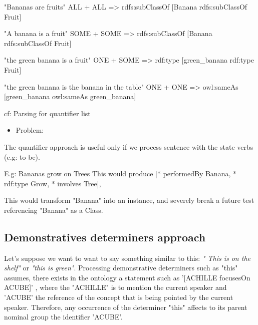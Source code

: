 \documentclass[twoside,a4paper,10pt]{report}
\newcommand{\dokutitleleveltree}[1]{\subsection{#1}}
\newcommand{\dokuitalic}[1]{\textsl{#1}}
\begin{document}
\small
\begin{verbatimtab}
  
  "Bananas         are             fruits"
    ALL             +               ALL                   => rdfs:subClassOf
  [Banana     rdfs:subClassOf      Fruit]
  
  "A banana        is               a fruit"
    SOME           +                 SOME                 => rdfs:subClassOf
  [Banana     rdfs:subClassOf       Fruit]
  
  "the green banana    is           a fruit"
     ONE               +             SOME                 => rdf:type
  [green_banana    rdf:type         Fruit]
  
  "the green banana     is       the banana in the table"
      ONE               +                ONE              => owl:sameAs
  [green_banana    owl:sameAs       green_banana]
  
  cf: Parsing for quantifier list
  
\end{verbatimtab}
\normalsize
\begin{itemize}
\item  Problem:
\end{itemize}


The quantifier approach is useful only if we process sentence with the state verbs (e.g: to be).


\small
\begin{verbatimtab}
  
  E.g: Bananas grow on Trees
  This would produce 
  [* performedBy Banana, 
   * rdf:type Grow,
   * involves Tree], 
  
  This would transform "Banana" into an instance, and severely break a future test referencing
"Banana" as a Class.
  
\end{verbatimtab}
\normalsize

\dokutitleleveltree{Demonstratives determiners approach}
\label{b4ad6f4ec31665f1d879aeafb5ba415e}%
Let's suppose we want to want to say something similar to this: \dokuitalic{" This is on the shelf"} or \dokuitalic{"this is green"}.
Processing demonstrative determiners such as "this" assumes, there exists in the ontology a statement such as '[ACHILLE focusesOn A{\textunderscore}CUBE]' , where the "ACHILLE"
is to mention the current speaker and 'A{\textunderscore}CUBE' the reference of the concept that is being pointed by the current speaker.
Therefore, any occurrence of the determiner "this" affects to its parent nominal group the identifier 'A{\textunderscore}CUBE'.
\end{document}
